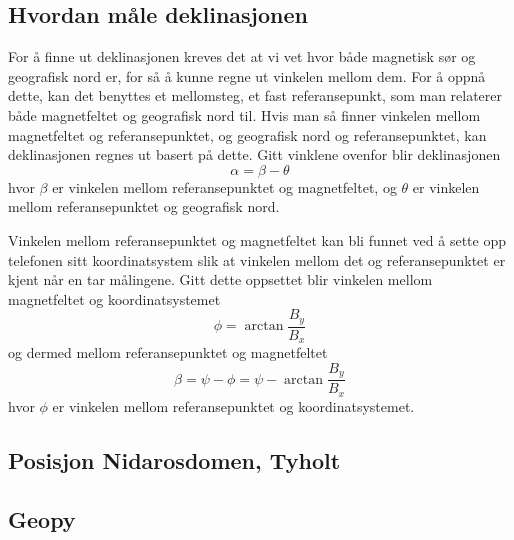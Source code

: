 \subsection{Hvordan måle deklinasjonen}
For å finne ut deklinasjonen kreves det at vi vet hvor både magnetisk sør og 
geografisk nord er, for så å kunne regne ut vinkelen mellom dem. For å oppnå dette, 
kan det benyttes et mellomsteg, et fast referansepunkt, som man relaterer både 
magnetfeltet og geografisk nord til. Hvis man så finner vinkelen mellom magnetfeltet 
og referansepunktet, og geografisk nord og referansepunktet, kan deklinasjonen 
regnes ut basert på dette. Gitt vinklene ovenfor blir deklinasjonen
\begin{equation}
    \alpha = \beta - \theta
\end{equation}
hvor $\beta$ er vinkelen mellom referansepunktet og magnetfeltet, og $\theta$ er 
vinkelen mellom referansepunktet og geografisk nord.

Vinkelen mellom referansepunktet og magnetfeltet kan bli funnet ved å sette opp 
telefonen sitt koordinatsystem slik at vinkelen mellom det og referansepunktet er 
kjent når en tar målingene. Gitt dette oppsettet blir vinkelen mellom magnetfeltet 
og koordinatsystemet
\begin{equation}
    \phi = \arctan \frac{B_y}{B_x}
\end{equation}
og dermed mellom referansepunktet og magnetfeltet
\begin{equation}
    \beta = \psi - \phi = \psi - \arctan \frac{B_y}{B_x}
\end{equation}
hvor $\phi$ er vinkelen mellom referansepunktet og koordinatsystemet.

\subsection{Posisjon Nidarosdomen, Tyholt}

\subsection{Geopy}


